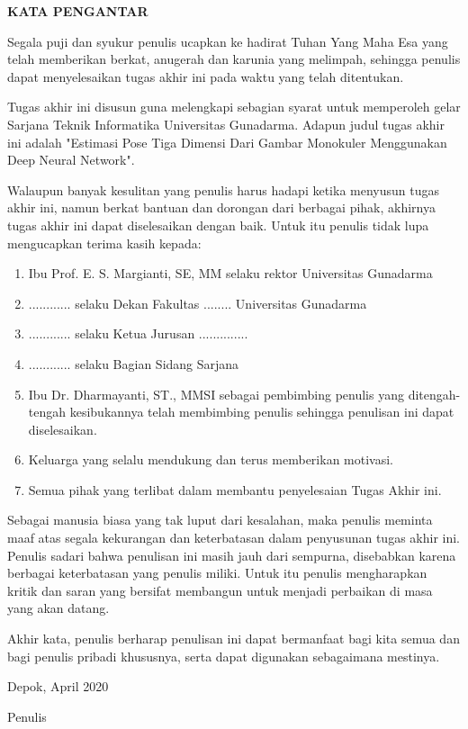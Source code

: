 \newpage %
\begin{center}
  \begin{large}\textbf{KATA PENGANTAR}\\\end{large}
\end{center}
\vspace{5mm}


Segala puji dan syukur penulis ucapkan ke hadirat Tuhan Yang Maha Esa yang telah memberikan berkat,
anugerah dan karunia yang melimpah, sehingga penulis dapat menyelesaikan tugas akhir ini pada waktu
yang telah ditentukan.

Tugas akhir ini disusun guna melengkapi sebagian syarat untuk memperoleh gelar Sarjana Teknik
Informatika Universitas Gunadarma. Adapun judul tugas akhir ini adalah "Estimasi Pose Tiga Dimensi
Dari Gambar Monokuler Menggunakan Deep Neural Network".

Walaupun banyak kesulitan yang penulis harus hadapi ketika menyusun tugas akhir ini, namun berkat
bantuan dan dorongan dari berbagai pihak, akhirnya tugas akhir ini dapat diselesaikan dengan baik.
Untuk itu penulis tidak lupa mengucapkan terima kasih kepada:

\begin{enumerate}
  \item Ibu Prof. E. S. Margianti, SE, MM selaku rektor Universitas Gunadarma
  \item ............ selaku Dekan Fakultas ........ Universitas Gunadarma
  \item ............ selaku Ketua Jurusan ..............
  \item ............ selaku Bagian Sidang Sarjana
  \item Ibu Dr. Dharmayanti, ST., MMSI sebagai pembimbing penulis yang ditengah-tengah kesibukannya
        telah membimbing penulis sehingga penulisan ini dapat diselesaikan.
  \item Keluarga yang selalu mendukung dan terus memberikan motivasi.
  \item Semua pihak yang terlibat dalam membantu penyelesaian Tugas Akhir ini.

\end{enumerate}

Sebagai manusia biasa yang tak luput dari kesalahan, maka penulis meminta maaf atas segala
kekurangan dan keterbatasan dalam penyusunan tugas akhir ini. Penulis sadari bahwa penulisan ini
masih jauh dari sempurna, disebabkan karena berbagai keterbatasan yang penulis miliki. Untuk itu
penulis mengharapkan kritik dan saran yang bersifat membangun untuk menjadi perbaikan di masa yang
akan datang.

Akhir kata, penulis berharap penulisan ini dapat bermanfaat bagi kita semua dan bagi penulis
pribadi khususnya, serta dapat digunakan sebagaimana mestinya.


\vspace{0.5 cm}
\begin{flushright}
  Depok, April 2020

  \vspace{2 cm}
  Penulis
\end{flushright}